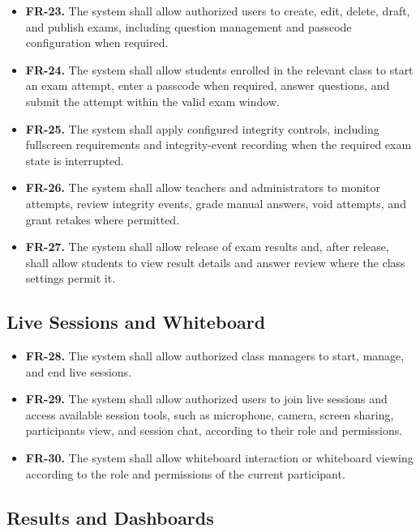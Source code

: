 \begin{itemize}
  \item \textbf{FR-23.} The system shall allow authorized users to create,
    edit, delete, draft, and publish exams, including question management and
    passcode configuration when required.
  \item \textbf{FR-24.} The system shall allow students enrolled in the relevant class to start an exam attempt, enter a passcode when required, answer questions, and submit the attempt within the valid exam window.
  \item \textbf{FR-25.} The system shall apply configured integrity controls,
    including fullscreen requirements and integrity-event recording when the
    required exam state is interrupted.
  \item \textbf{FR-26.} The system shall allow teachers and administrators to
    monitor attempts, review integrity events, grade manual answers, void
    attempts, and grant retakes where permitted.
  \item \textbf{FR-27.} The system shall allow release of exam results and,
    after release, shall allow students to view result details and answer
    review where the class settings permit it.
\end{itemize}

\subsection*{Live Sessions and Whiteboard}

\begin{itemize}
  \item \textbf{FR-28.} The system shall allow authorized class managers to
    start, manage, and end live sessions.
  \item \textbf{FR-29.} The system shall allow authorized users to join live sessions and access available session tools, such as microphone, camera, screen sharing, participants view, and session chat, according to their role and permissions.
  \item \textbf{FR-30.} The system shall allow whiteboard interaction or
    whiteboard viewing according to the role and permissions of the current
    participant.
\end{itemize}

\subsection*{Results and Dashboards}

